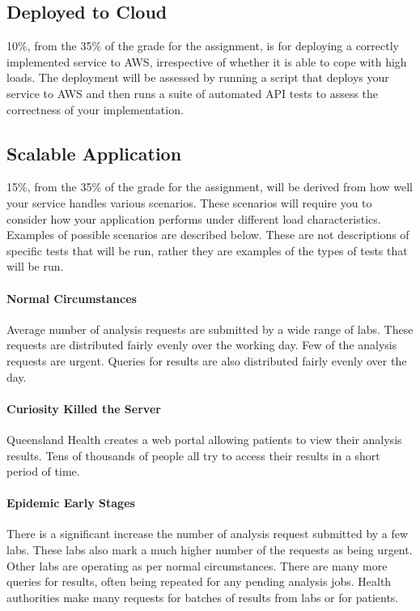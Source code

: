 \documentclass{csse4400}
\begin{document}
\subsection{Deployed to Cloud} %
10\%, from the 35\% of the grade for the assignment, is for deploying a correctly implemented service to AWS,
irrespective of whether it is able to cope with high loads.
The deployment will be assessed by running a script that deploys your service to AWS
and then runs a suite of automated API tests to assess the correctness of your implementation.

\subsection{Scalable Application}\label{sec:scenarios} %
15\%, from the 35\% of the grade for the assignment, will be derived from how well your service handles various scenarios.
These scenarios will require you to consider how your application performs under different load characteristics.
Examples of possible scenarios are described below.
These are not descriptions of specific tests that will be run,
rather they are examples of the types of tests that will be run.

\paragraph{Normal Circumstances}
Average number of analysis requests are submitted by a wide range of labs.
These requests are distributed fairly evenly over the working day.
Few of the analysis requests are urgent.
Queries for results are also distributed fairly evenly over the day.

\paragraph{Curiosity Killed the Server}
Queensland Health creates a web portal allowing patients to view their analysis results.
Tens of thousands of people all try to access their results in a short period of time.

\paragraph{Epidemic Early Stages}
There is a significant increase the number of analysis request submitted by a few labs.
These labs also mark a much higher number of the requests as being urgent.
Other labs are operating as per normal circumstances.
There are many more queries for results, often being repeated for any pending analysis jobs.
Health authorities make many requests for batches of results from labs or for patients.
\end{document}

